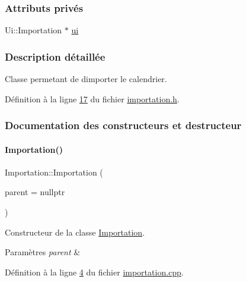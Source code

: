 \subsubsection*{Attributs privés}
\begin{DoxyCompactItemize}
\item 
Ui\+::\+Importation $\ast$ \hyperlink{class_importation_ace5d522c27957bac47fd8d3234af1d2e}{ui}
\end{DoxyCompactItemize}


\subsubsection{Description détaillée}
Classe permetant de d\textquotesingle{}importer le calendrier. 

Définition à la ligne \hyperlink{importation_8h_source_l00017}{17} du fichier \hyperlink{importation_8h_source}{importation.\+h}.



\subsubsection{Documentation des constructeurs et destructeur}
\mbox{\label{class_importation_ad3a625fb90d559ff048151a4cb4646b4}} 
\paragraph{\texorpdfstring{Importation()}{Importation()}}
{\footnotesize\ttfamily Importation\+::\+Importation (\begin{DoxyParamCaption}\item[{\hyperlink{class_q_widget}{Q\+Widget} $\ast$}]{parent = {\ttfamily nullptr} }\end{DoxyParamCaption})\hspace{0.3cm}{\ttfamily [explicit]}}



Constructeur de la classe \hyperlink{class_importation}{Importation}. 


\begin{DoxyParams}{Paramètres}
{\em parent} & \\
\hline
\end{DoxyParams}


Définition à la ligne \hyperlink{importation_8cpp_source_l00004}{4} du fichier \hyperlink{importation_8cpp_source}{importation.\+cpp}.



